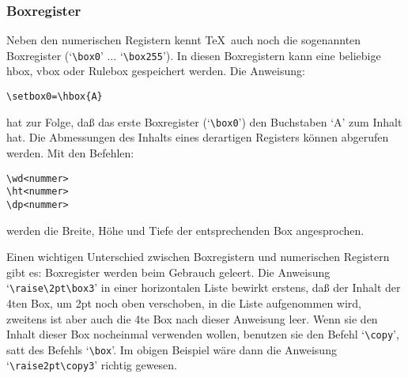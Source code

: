\subsubsection{Boxregister}
Neben den numerischen Registern kennt \TeX\ auch noch die sogenannten
Boxregister (`\verb|\box0|' $\ldots$ `\verb|\box255|'). In diesen
Boxregistern kann eine beliebige hbox, vbox oder Rulebox gespeichert
werden. Die Anweisung:
\begin{verbatim}
\setbox0=\hbox{A}
\end{verbatim}
hat zur Folge, da\ss{} das erste Boxregister (`\verb|\box0|') den
Buchstaben `A' zum Inhalt hat. Die Abmessungen des Inhalts eines
derartigen Registers k\"onnen abgerufen werden. Mit den Befehlen:
\begin{verbatim}
\wd<nummer>
\ht<nummer>
\dp<nummer>
\end{verbatim}
werden die Breite, H\"ohe und Tiefe der entsprechenden
Box angesprochen.

Einen wichtigen Unterschied zwischen Boxregistern und numerischen
Registern gibt es: Boxregister werden beim Gebrauch geleert. Die
Anweisung 
`\verb|\raise\2pt\box3|' in einer 
horizontalen Liste bewirkt
erstens, da\ss{} der Inhalt der 4ten Box, um 2pt noch oben verschoben, in
die Liste aufgenommen wird, zweitens ist aber auch die 4te Box nach
dieser Anweisung leer. Wenn sie den Inhalt dieser Box nocheinmal
verwenden wollen, benutzen sie den Befehl 
`\verb|\copy|', satt des
Befehls `\verb|\box|'. Im obigen Beispiel w\"are dann die Anweisung
`\verb|\raise2pt\copy3|' richtig gewesen.

